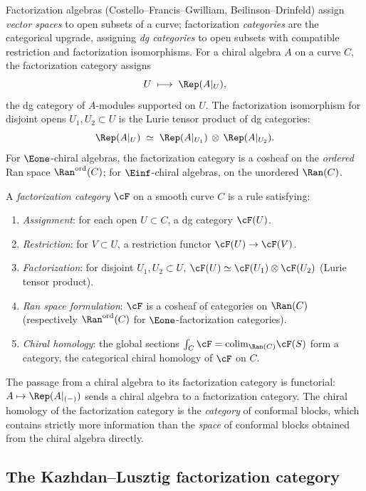 Factorization algebras (Costello--Francis--Gwilliam, Beilinson--Drinfeld) assign \emph{vector spaces} to open subsets of a curve; factorization \emph{categories} are the categorical upgrade, assigning \emph{dg categories} to open subsets with compatible restriction and factorization isomorphisms. For a chiral algebra $A$ on a curve $C$, the factorization category assigns
\[
 U \;\longmapsto\; \Rep(A|_U),
\]
the dg category of $A$-modules supported on $U$. The factorization isomorphism for disjoint opens $U_1, U_2 \subset U$ is the Lurie tensor product of dg categories:
\[
 \Rep(A|_U) \;\simeq\; \Rep(A|_{U_1}) \,\otimes\, \Rep(A|_{U_2}).
\]
For $\Eone$-chiral algebras, the factorization category is a cosheaf on the \emph{ordered} Ran space $\Ran^{\mathrm{ord}}(C)$; for $\Einf$-chiral algebras, on the unordered $\Ran(C)$.

\begin{definition}
\label{def:factorization-category}
A \emph{factorization category} $\cF$ on a smooth curve $C$ is a rule satisfying:
\begin{enumerate}[label=\textup{(FC\arabic*)}]
 \item \emph{Assignment}: for each open $U \subset C$, a dg category $\cF(U)$.
 \item \emph{Restriction}: for $V \subset U$, a restriction functor $\cF(U) \to \cF(V)$.
 \item \emph{Factorization}: for disjoint $U_1, U_2 \subset U$,
 $\cF(U) \simeq \cF(U_1) \otimes \cF(U_2)$ (Lurie tensor product).
 \item \emph{Ran space formulation}: $\cF$ is a cosheaf of categories on $\Ran(C)$
 (respectively $\Ran^{\mathrm{ord}}(C)$ for $\Eone$-factorization categories).
 \item \emph{Chiral homology}: the global sections $\int_C \cF = \mathrm{colim}_{\Ran(C)} \cF(S)$
 form a category, the categorical chiral homology of $\cF$ on $C$.
\end{enumerate}
\end{definition}

The passage from a chiral algebra to its factorization category is functorial: $A \mapsto \Rep(A|_{(-)})$ sends a chiral algebra to a factorization category. The chiral homology of the factorization category is the \emph{category} of conformal blocks, which contains strictly more information than the \emph{space} of conformal blocks obtained from the chiral algebra directly.


\subsection{The Kazhdan--Lusztig factorization category}
\label{subsec:kl-factorization-category}

